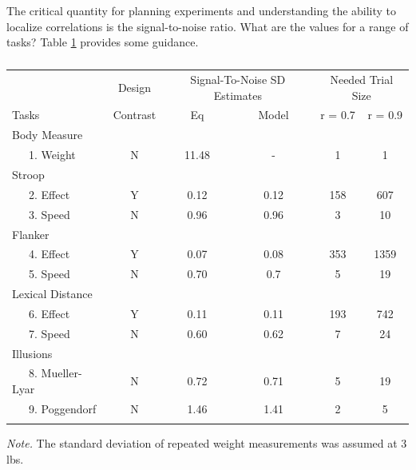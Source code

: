 \documentclass[
  ,man]{apa6}
\begin{document}
The critical quantity for planning experiments and understanding the ability to localize correlations is the signal-to-noise ratio. What are the values for a range of tasks? Table \ref{tab:allTasks} provides some guidance.

\begin{table}[tbp]

\begin{center}
\begin{threeparttable}

\caption{\label{tab:allTasks}}

\begin{tabular}{lccccc}
\toprule
 & \multicolumn{1}{c}{Design} & \multicolumn{2}{c}{Signal-To-Noise SD
                        Estimates} & \multicolumn{2}{c}{Needed Trial Size} \\
\cmidrule(r){2-2} \cmidrule(r){3-4} \cmidrule(r){5-6}
Tasks & \multicolumn{1}{c}{Contrast} & \multicolumn{1}{c}{Eq} & \multicolumn{1}{c}{Model} & \multicolumn{1}{c}{r = 0.7} & \multicolumn{1}{c}{r = 0.9}\\
\midrule
Body Measure &  &  &  &  & \\
\ \ \ 1. Weight & N & 11.48 & - & 1 & 1\\
Stroop &  &  &  &  & \\
\ \ \ 2. Effect & Y & 0.12 & 0.12 & 158 & 607\\
\ \ \ 3. Speed & N & 0.96 & 0.96 & 3 & 10\\
Flanker &  &  &  &  & \\
\ \ \ 4. Effect & Y & 0.07 & 0.08 & 353 & 1359\\
\ \ \ 5. Speed & N & 0.70 & 0.7 & 5 & 19\\
Lexical Distance &  &  &  &  & \\
\ \ \ 6. Effect & Y & 0.11 & 0.11 & 193 & 742\\
\ \ \ 7. Speed & N & 0.60 & 0.62 & 7 & 24\\
Illusions &  &  &  &  & \\
\ \ \ 8. Mueller-Lyar & N & 0.72 & 0.71 & 5 & 19\\
\ \ \ 9. Poggendorf & N & 1.46 & 1.41 & 2 & 5\\
\bottomrule
\addlinespace
\end{tabular}

\begin{tablenotes}[para]
\normalsize{\textit{Note.} The standard deviation of repeated weight measurements was assumed at 3 lbs.}
\end{tablenotes}

\end{threeparttable}
\end{center}

\end{table}
\end{document}
